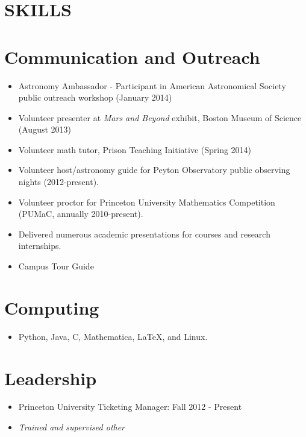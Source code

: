 \documentclass[margin]{res}
\begin{document}
\begin{resume}
\section{SKILLS}
\normalsize{\section{Communication and Outreach}}
                  \begin{itemize}
                  \item Astronomy Ambassador - Participant in American
                    Astronomical Society public outreach workshop (January 2014)
                  \item Volunteer presenter at \textit{Mars and
                    Beyond} exhibit, Boston Museum of Science (August
                    2013)
                  \item Volunteer math tutor, Prison Teaching
                      Initiative (Spring 2014)
                  \item Volunteer host/astronomy guide for Peyton Observatory public
                    observing nights (2012-present).
                  \item Volunteer proctor for Princeton University
                    Mathematics Competition (PUMaC, annually 2010-present).
                  \item Delivered numerous academic presentations for
                    courses and research internships.
                  \item Campus Tour Guide
                  \end{itemize} 
\normalsize{\section{Computing}}
                 \begin{itemize}
                 \item Python, Java, C, Mathematica, \LaTeX, and
                   Linux.
                 \end{itemize}
\normalsize{\section{Leadership}}
	           \begin{itemize} 
                   \item Princeton University Ticketing Manager: Fall
                     2012 - Present
                    \item[] \textit{Trained and supervised other
}
\end{itemize}
\end{resume}
\end{document}
